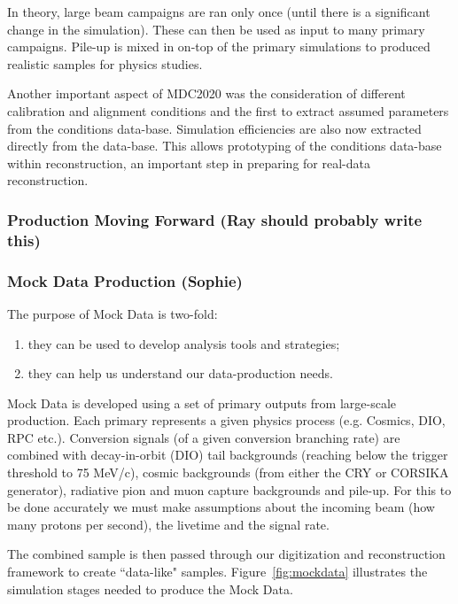 In theory, large beam campaigns are ran only once (until there is a significant change in the simulation). These can then be used as input to many primary campaigns. Pile-up is mixed in on-top of the primary simulations to produced realistic samples for physics studies.

Another important aspect of MDC2020 was the consideration of different calibration and alignment conditions and the first to extract assumed parameters from the conditions data-base. Simulation efficiencies are also now extracted directly from the data-base. This allows prototyping of the conditions data-base within reconstruction, an important step in preparing for real-data reconstruction.


\subsubsection{Production Moving Forward (Ray should probably write this)}


\subsubsection{Mock Data Production (Sophie)}
\label{mock_data}

The purpose of Mock Data is two-fold: \begin{enumerate}
    \item they can be used to develop analysis tools and strategies;
    \item they can help us understand our data-production needs. 
\end{enumerate}

Mock Data is developed using a set of primary outputs from large-scale production. Each primary represents a given physics process (e.g. Cosmics, DIO, RPC etc.). Conversion signals (of a given conversion branching rate) are combined with decay-in-orbit (DIO) tail backgrounds (reaching below the trigger threshold to 75 MeV/c), cosmic backgrounds (from either the CRY or CORSIKA generator), radiative pion and muon capture backgrounds and pile-up. For this to be done accurately we must make assumptions about the incoming beam (how many protons per second), the livetime and the signal rate.

The combined sample is then passed through our digitization and reconstruction framework to create ``data-like" samples. Figure~\ref{fig:mockdata} illustrates the simulation stages needed to produce the Mock Data.

